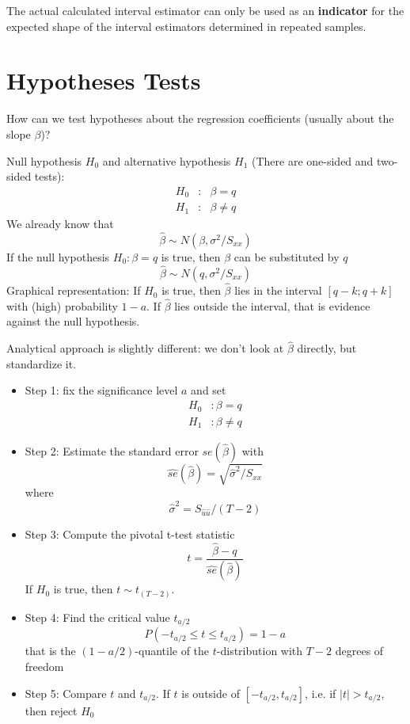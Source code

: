 \documentclass{article}
\begin{document}
The actual calculated interval estimator can only be used as an \textbf{indicator} for the expected shape of the interval estimators determined in repeated samples.
\section{Hypotheses Tests}

How can we test hypotheses about the regression coefficients (usually about the slope $\beta $)?

Null hypothesis $H_{0}$ and alternative hypothesis $H_{1}$ (There are one-sided and two-sided tests):
\begin{eqnarray*}
H_{0} &:&\beta=q \\
H_{1} &:&\beta\neq q
\end{eqnarray*}
We already know that
\[ \hat\beta\sim N(\beta,\sigma^2/S_{xx}) \]
If the null hypothesis $H_{0}:\beta =q$ is true, then $\beta $ can be
substituted by $q$
\[ \hat\beta\sim N(q,\sigma^2/S_{xx}) \]
Graphical representation: If $H_0$ is true, then $\hat\beta$ lies in the interval $[q-k; q+k]$ with (high) probability $1-a$. If $\hat\beta$ lies outside the interval, that is evidence against the null hypothesis.

Analytical approach is slightly different: we don't look at $\hat\beta$ directly, but standardize it.
\begin{itemize}
\item Step 1: fix the significance level $a$ and set
\begin{align*}
H_0&: \beta=q\\
H_1&: \beta\neq q
\end{align*}

\item Step 2: Estimate the standard error $se(\hat{\beta})$ with
\[ \widehat{se}(\hat\beta)=\sqrt{\hat\sigma^2/S_{xx}} \]
where
\[ \hat\sigma^2=S_{\hat u \hat u}/(T-2) \]
\item Step 3: Compute the pivotal t-test statistic
\[ t=\frac{\hat{\beta}-q}{\widehat{se}(\hat{\beta})} \]
If $H_0$ is true, then $t\sim t_{(T-2)}$.
\item Step 4: Find the critical value $t_{a/2}$
\[ P(-t_{a/2}\le t \le t_{a/2})=1-a \]
that is the $(1-a/2)$-quantile of the $t$-distribution with $T-2$ degrees of freedom
\item Step 5: Compare $t$ and $t_{a/2}$. If $t$ is outside of $[-t_{a/2}, t_{a/2}]$, i.e. if $|t|>t_{a/2}$, then reject $H_0$
\end{itemize}
\end{document}

